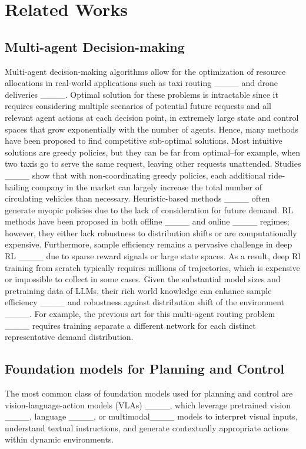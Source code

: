 \section{Related Works}
\subsection{Multi-agent Decision-making}
Multi-agent decision-making algorithms allow for the optimization of resource allocations in real-world applications such as taxi routing ____ and drone deliveries ____. Optimal solution for these problems is intractable since it requires considering multiple scenarios of potential future requests and all relevant agent actions at each decision point, in extremely large state and control spaces that grow exponentially with the number of agents. Hence, many methods have been proposed to find competitive sub-optimal solutions. Most intuitive solutions are greedy policies, but they can be far from optimal--for example, when two taxis go to serve the same request, leaving other requests unattended. Studies ____ show that with non‐coordinating greedy policies, each additional ride‐hailing company in the market can largely increase the total number of circulating vehicles than necessary. Heuristic-based methods ____ often generate myopic policies due to the lack of consideration for future demand. RL methods have been proposed in both offline ____ and online ____ regimes; however, they either lack robustness to distribution shifts or are computationally expensive. Furthermore, sample efficiency remains a pervasive challenge in deep RL ____ due to sparse reward signals or large state spaces. As a result, deep Rl training from scratch typically requires millions of trajectories, which is expensive or impossible to collect in some cases. Given the substantial model sizes and pretraining data of LLMs, their rich world knowledge can enhance sample efficiency ____ and robustness against distribution shift of the environment ____. For example, the previous art for this multi-agent routing problem ____ requires training separate a different network for each distinct representative demand distribution.


\subsection{Foundation models for Planning and Control}
The most common class of foundation models used for planning and control are vision-language-action models (VLAs) ____, which leverage pretrained vision ____, language ____, or multimodal____ models to interpret visual inputs, understand textual instructions, and generate contextually appropriate actions within dynamic environments. 

